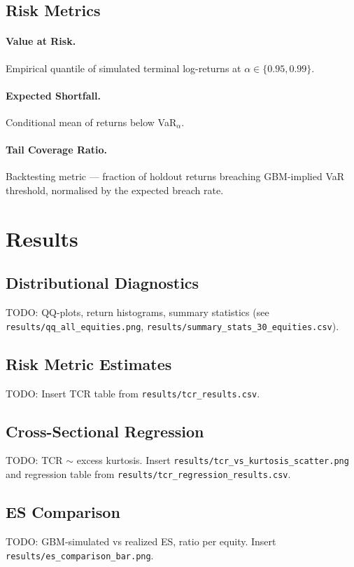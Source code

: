 \documentclass[11pt,a4paper]{article}
\begin{document}
\subsection{Risk Metrics}
\paragraph{Value at Risk.} Empirical quantile of simulated terminal log-returns at
$\alpha \in \{0.95, 0.99\}$.
\paragraph{Expected Shortfall.} Conditional mean of returns below VaR$_\alpha$.
\paragraph{Tail Coverage Ratio.} Backtesting metric --- fraction of holdout returns
breaching GBM-implied VaR threshold, normalised by the expected breach rate.

\section{Results}\label{sec:results}
\subsection{Distributional Diagnostics}
TODO: QQ-plots, return histograms, summary statistics
(see \texttt{results/qq\_all\_equities.png}, \texttt{results/summary\_stats\_30\_equities.csv}).

\subsection{Risk Metric Estimates}
TODO: Insert TCR table from \texttt{results/tcr\_results.csv}.

\subsection{Cross-Sectional Regression}
TODO: TCR $\sim$ excess kurtosis. Insert \texttt{results/tcr\_vs\_kurtosis\_scatter.png}
and regression table from \texttt{results/tcr\_regression\_results.csv}.

\subsection{ES Comparison}
TODO: GBM-simulated vs realized ES, ratio per equity. Insert
\texttt{results/es\_comparison\_bar.png}.
\end{document}
